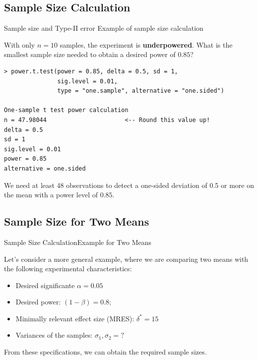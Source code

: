 \subsection{Sample Size Calculation}


\begin{frame}[fragile]{Sample size and Type-II error}
{Example of sample size calculation}

With only $n=10$ samples, the experiment is {\bf underpowered}. What is the smallest sample size needed to obtain a desired power of $0.85$?

{\smaller
\begin{verbatim}
> power.t.test(power = 0.85, delta = 0.5, sd = 1,
               sig.level = 0.01,
               type = "one.sample", alternative = "one.sided")

One-sample t test power calculation
n = 47.98044                      <-- Round this value up!
delta = 0.5
sd = 1
sig.level = 0.01
power = 0.85
alternative = one.sided
\end{verbatim}}

We need at least 48 observations to detect a one-sided deviation of 0.5 or more on the mean  with a power level of $0.85$.
\end{frame}

\subsection{Sample Size for Two Means}

\begin{frame}{Sample Size Calculation}{Example for Two Means}

Let's consider a more general example, where we are comparing two means with the following experimental characteristics:\bigskip

\begin{itemize}
  \item Desired significante $\alpha = 0.05$
  \item Desired power: $(1-\beta) = 0.8$;
  \item Minimally relevant effect size (MRES): $\delta^* = 15$
  \item Variances of the samples: $\sigma_1, \sigma_2 = ?$
\end{itemize}\bigskip

From these specifications, we can obtain the required sample sizes.
\end{frame}

